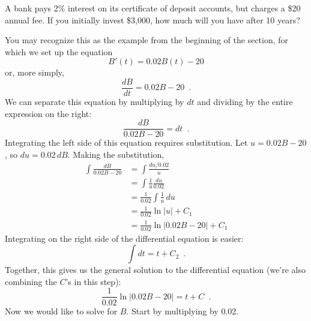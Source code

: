 \begin{example}
A bank pays 2\% interest on its certificate of deposit accounts, but charges a \$20 annual fee. If you initially invest \$3,000, how much will you have after 10 years?

\begin{solution}
  You may recognize this as the example from the beginning of the section, for which we set up the equation $$B'(t)=0.02B(t)-20$$ or, more simply,
$$\frac{dB}{dt}=0.02B-20 \enspace .$$
We can separate this equation by multiplying by $dt$ and dividing by the entire expression on the right:
$$\frac{dB}{0.02B-20}=dt \enspace .$$
Integrating the left side of this equation requires substitution. Let $u=0.02B-20$, so $du=0.02\,dB$. Making the substitution,
\begin{align*}
  \int \frac{dB}{0.02B-20} &=\int \frac{du/0.02}{u} \\
    &= \int \frac{1}{u}\frac{du}{0.02} \\
    &= \frac{1}{0.02}\int \frac{1}{u}\,du \\
    &= \frac{1}{0.02}\ln|u| + C_1 \\
    &= \frac{1}{0.02}\ln|0.02B-20| + C_1
\end{align*}
Integrating on the right side of the differential equation is easier:
$$\int dt=t+C_2 \enspace .$$
Together, this gives us the general solution to the differential equation (we're also combining the $C$'s in this step):
$$\frac{1}{0.02}\ln|0.02B-20|=t+C \enspace .$$
Now we would like to solve for $B$. Start by multiplying by 0.02.


\end{solution}
\end{example}
